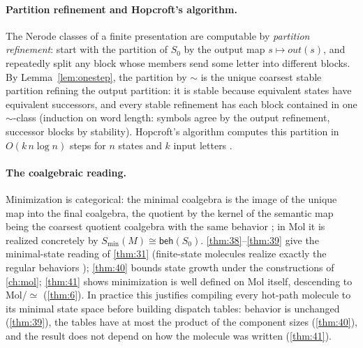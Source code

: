 \paragraph{Partition refinement and Hopcroft's algorithm.}
The Nerode classes of a finite presentation are computable by \emph{partition
refinement}: start with the partition of $S_0$ by the output map $s \mapsto
\mathit{out} (s)$, and repeatedly split any block whose members send some letter into
different blocks. By Lemma~\ref{lem:onestep}, the partition by $\sim$ is the unique
coarsest stable partition refining the output partition: it is stable because
equivalent states have equivalent successors, and every stable refinement has each
block contained in one $\sim$-class (induction on word length: symbols agree by the
output refinement, successor blocks by stability). Hopcroft's algorithm computes this
partition in $O (k\,n \log n)$ steps for $n$ states and $k$ input letters
\citep{hopcroft}.

\paragraph{The coalgebraic reading.}
Minimization is categorical: the minimal coalgebra is the image of the unique map into
the final coalgebra, the quotient by the kernel of the semantic map being the coarsest
quotient coalgebra with the same behavior
\citep{arxiv-coalgebra-min,arxiv-coalgebra-min-2}; in Mol it is realized concretely by
$S_{\min} (M) \cong \mathsf{beh} (S_0)$. \autoref{thm:38}--\autoref{thm:39} give the minimal-state reading of
\autoref{thm:31} (finite-state molecules realize exactly the regular behaviors
\citep{brzozowski}); \autoref{thm:40} bounds state growth under the constructions of
\autoref{ch:mol}; \autoref{thm:41} shows minimization is well defined on Mol itself, descending to
Mol/$\simeq$ (\autoref{thm:6}). In practice this justifies compiling every hot-path
molecule to its minimal state space before building dispatch tables: behavior is
unchanged (\autoref{thm:39}), the tables have at most the product of the component sizes (\autoref{thm:40}),
and the result does not depend on how the molecule was written (\autoref{thm:41}).
